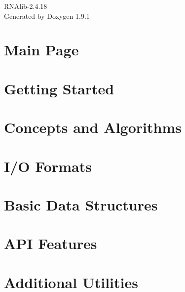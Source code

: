 \let\mypdfximage\pdfximage\def\pdfximage{\immediate\mypdfximage}\documentclass[twoside]{book}
\newcommand{\+}{\discretionary{\mbox{\scriptsize$\hookleftarrow$}}{}{}}
\newcommand{\clearemptydoublepage}{%
  \newpage{\pagestyle{empty}\cleardoublepage}%
}
\begin{document}
\raggedbottom

\hypersetup{pageanchor=false,
             bookmarksnumbered=true,
             pdfencoding=unicode
            }
\begin{titlepage}
\vspace*{7cm}
\begin{center}%
{\Large RNAlib-\/2.4.18 }\\
\vspace*{1cm}
{\large Generated by Doxygen 1.9.1}\\
\end{center}
\end{titlepage}
\clearemptydoublepage
{}
\tableofcontents
\clearemptydoublepage
{}
\hypersetup{pageanchor=true}

\chapter{Main Page}
\label{index}\hypertarget{index}{}
\chapter{Getting Started}
\label{getting_started}

\chapter{Concepts and Algorithms}
\label{concepts}

\chapter{I/O Formats}
\label{io}

\chapter{Basic Data Structures}
\label{data_structures}

\chapter{API Features}
\label{api_features}

\chapter{Additional Utilities}
\label{utilities}

\end{document}
